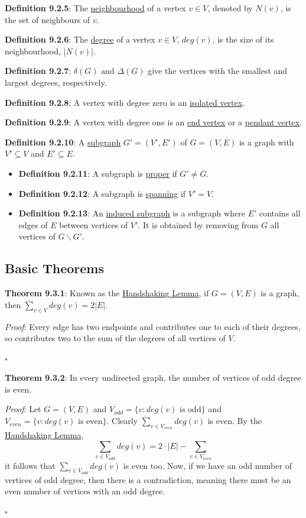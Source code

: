 \documentclass{article}
\newcommand{\separate}[1] {\vspace{#1 pt}\noindent}
\newcommand{\definition}[2]{\textbf{Definition #1}: #2\label{def:#1}}
\newcommand{\proof}[2]{\textit{Proof}: #2 \begin{flushright}\(\square\)\end{flushright}\label{prf:#1}}
\newcommand{\theorem}[3]{\textbf{Theorem #1}: #2 \par\separate{3}\proof{thm:#1}{#3}\label{thm:#1}}
\begin{document}
\separate{5}\definition{9.2.5}{The \underline{neighbourhood} of a vertex \(v \in V\), denoted by \(N(v)\), is the set of neighbours of \(v\).}

\separate{5}\definition{9.2.6}{The \underline{degree} of a vertex \(v \in V\), \(deg(v)\), is the size of its neighbourhood, \(|N(v)|\).}

\separate{5}\definition{9.2.7}{\underline{\(\delta(G) \text{ and } \Delta(G)\)} give the vertices with the smallest and largest degrees, respectively.}

\separate{5}\definition{9.2.8}{A vertex with degree zero is an \underline{isolated vertex}.}

\separate{5}\definition{9.2.9}{A vertex with degree one is an \underline{end vertex} or a \underline{pendant vertex}.}

\separate{5}\definition{9.2.10}{A \underline{subgraph} \(G'=(V',E')\) of \(G=(V,E)\) is a graph with \(V' \subseteq V\) and \(E' \subseteq E\).}
\begin{itemize}
    \item \definition{9.2.11}{A subgraph is \underline{proper} if \(G'\neq G\).}
    \item \definition{9.2.12}{A subgraph is \underline{spanning} if \(V' = V\).}
    \item \definition{9.2.13}{An \underline{induced subgraph} is a subgraph where \(E'\) contains all edges of \(E\) between vertices of \(V'\). It is obtained by removing from \(G\) all vertices of \(G \backslash G'\).}
\end{itemize}

\subsection{Basic Theorems}

\separate{5}\theorem{9.3.1}{Known as the \underline{Handshaking Lemma}, if \(G=(V,E)\) is a graph, then \(\sum_{v\in V} deg(v) = 2|E|\).}
{Every edge has two endpoints and contributes one to each of their degrees, so contributes two to the sum of the degrees of all vertices of \(V\).}

\separate{5}\theorem{9.3.2}{In every undirected graph, the number of vertices of odd degree is even.}
{Let \(G=(V,E)\) and \(V_{odd} = \{v:deg(v) \text{ is odd}\}\) and \(V_{even} = \{v:deg(v) \text{ is even}\}\). Clearly \(\sum_{v\in V_{even}} deg(v)\) is even. By the \hyperref[thm:9.3.1]{Handshaking Lemma},
\begin{equation}
    \sum_{v \in V_{odd}} deg(v) = 2 \cdot |E| - \sum_{v \in V_{even}}
\end{equation}
it follows that \(\sum_{v \in V_{odd}} deg(v)\) is even too. Now, if we have an odd number of vertices of odd degree, then there is a contradiction, meaning there must be an even number of vertices with an odd degree.} 
\end{document}
